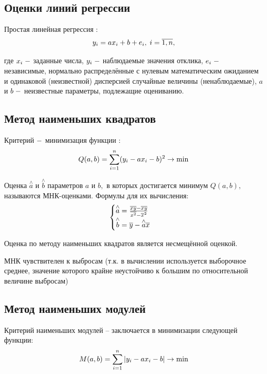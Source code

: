 \documentclass[a4]{article}
\begin{document}
\subsection{Оценки линий регрессии}
Простая линейная регрессия :
\begin{equation}
y_i=ax_i+b+e_i,\;i=\overline{1,n},\hfill
\end{equation}

где $x_i\;\--$ заданные числа, $y_i\;\--$ наблюдаемые значения отклика, $e_i\;\--$ независимые, нормально распределённые с нулевым математическим ожиданием и одинаковой (неизвестной) дисперсией случайные величины (ненаблюдаемые), $a$ и $b\;\--$ неизвестные параметры, подлежащие оцениванию.

\subsection{Метод наименьших квадратов}

Критерий $\--$ минимизация функции :
\begin{equation}
Q(a,b)=\sum\limits_{i=1}^n(y_i-ax_i-b)^2\to \min\hfill
\end{equation}

Оценка $\overset{\wedge}{a}$ и $\overset{\wedge}{b}$ параметров $a$ и $b,$ в которых достигается минимум $Q(a,b),$ называются МНК-оценками. Формулы для их вычисления:
\begin{equation}
\begin{cases}
\overset{\wedge}{a} = \frac{\overline{x y}-\overline{x}\overline{y}}{\overline{x^2}-\overline{x}^2}\\
\overset{\wedge}{b} = \overline{y}-\overset{\wedge}{a}\overline{x}
\end{cases}\hfill
\end{equation}

Оценка по методу наименьших квадратов является несмещённой оценкой.

МНК чувствителен к выбросам (т.к. в вычислении используется выборочное среднее, значение которого крайне неустойчиво к большим по относительной величине выбросам)

\subsection{Метод наименьших модулей}
Критерий наименьших модулей – заключается в минимизации следующей функции:
\begin{equation}
M(a,b) = \sum\limits_{i=1}^n\vert y_i-ax_i-b\vert\to\min\hfill
\end{equation}
\end{document}
